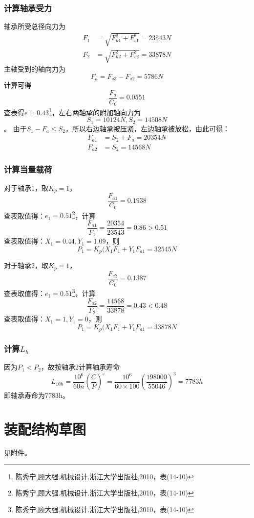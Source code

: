 	\subsubsection{计算轴承受力}
	轴承所受总径向力为
	\begin{align}
		F_1 & = \sqrt{F_{h1}^2+F_{v1}^2} = 23543N\\
		F_2 & = \sqrt{F_{h2}^2+F_{v2}^2} = 33878N
	\end{align}
	主轴受到的轴向力为
	\begin{equation}
		F_a = F_{a3} - F_{a2} = 5786N
	\end{equation}
	计算可得
	\begin{equation}
		\frac{F_a}{C_0} = 0.0551
	\end{equation}
	查表得$e = 0.43$\footnote{陈秀宁,顾大强.机械设计.浙江大学出版社,2010，表(14-10)}，左右两轴承的附加轴向力为
	\begin{equation}
		S_1 = 10124N,S_2 = 14508N
	\end{equation}。
	由于$S_1 - F_a \leq S_2$，所以右边轴承被压紧，左边轴承被放松，由此可得：
	\begin{align}
		F_{a1} & = S_2+F_a = 20354N\\
		F_{a2} & = S_2 = 14568N
	\end{align}
	\subsubsection{计算当量载荷}
	对于轴承1，取$K_p = 1$，
	\begin{equation}
		\dfrac{F_{a1}}{C_0} = 0.1938
	\end{equation}
	查表取值得：$e_1 = 0.51$\footnote{陈秀宁,顾大强.机械设计.浙江大学出版社,2010，表(14-10)}，计算\begin{equation}
		\dfrac{F_{a1}}{F_1} = \dfrac{20354}{23543} = 0.86 > 0.51
	\end{equation}
	查表取值得：$X_1 = 0.44,Y_1 = 1.09$，则
	\[P_1 = K_p(X_1F_1 + Y_1F_{a1} = 32545N\]

	对于轴承2，取$K_p = 1$，
	\begin{equation}
		\dfrac{F_{a2}}{C_0} = 0.1387
	\end{equation}
	查表取值得：$e_1 = 0.51$\footnote{陈秀宁,顾大强.机械设计.浙江大学出版社,2010，表(14-10)}，计算\begin{equation}
		\dfrac{F_{a2}}{F_2} = \dfrac{14568}{33878} = 0.43 < 0.48
	\end{equation}
	查表取值得：$X_1 = 1,Y_1 =0$，则
	\[P_1 = K_p(X_1F_1 + Y_1F_{a1} = 33878N \]

	\subsubsection{计算$L_h$}
	因为$P_1 < P_2$，故按轴承2计算轴承寿命
	\begin{equation}
		L_{10h}=\frac{10^6}{60n}(\frac{C}{P})^{\varepsilon}=\frac{10^6}{60\times 100}(\frac{198000}{55046})^3 = 7783h
	\end{equation}
	即轴承寿命为7783h。

\section{装配结构草图}
	见附件。
